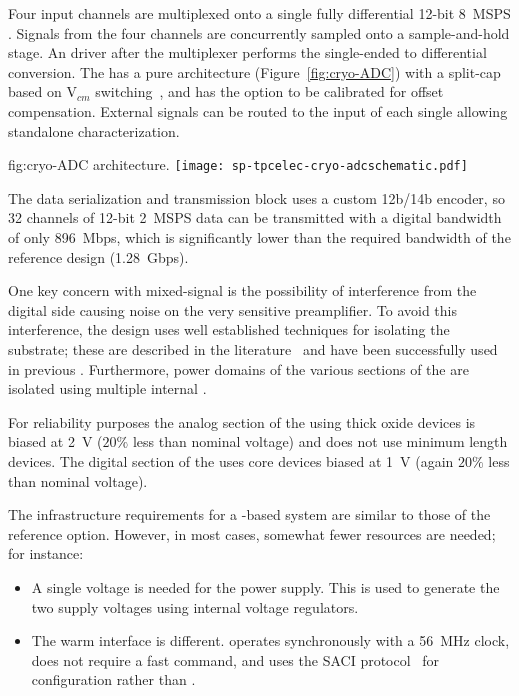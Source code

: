 Four input channels are multiplexed onto a single fully differential 12-bit \SI{8}{MSPS} 
. Signals from the four channels are concurrently sampled onto a sample-and-hold 
stage. An  driver after the multiplexer performs the single-ended to differential 
conversion. The  has a pure  architecture (Figure~\ref{fig:cryo-ADC}) 
with a split-cap  based on V$_{cm}$ switching~\cite{5482529}, and has the option to be 
calibrated for offset compensation. External signals can be routed to the input of each single 
 allowing standalone characterization.

\begin{dunefigure}
{fig:cryo-ADC}
{  architecture.}
\texttt{[image: sp-tpcelec-cryo-adcschematic.pdf]}
\end{dunefigure}


The data serialization and transmission block uses a custom 12b/14b encoder, so 32 channels 
of 12-bit \SI{2}{MSPS} data can be transmitted with a digital bandwidth of only \SI{896}{Mbps}, 
which is significantly lower than the required bandwidth of the reference design (\SI{1.28}{Gbps}).

One key concern with mixed-signal  is the possibility of interference from the 
digital side causing noise on the very sensitive preamplifier. To avoid this interference, 
the  design uses well established techniques for isolating the substrate;
these are described in the literature~\cite{yeh} and have been successfully used in previous 
. Furthermore, power domains of the various sections of the  are 
isolated using multiple internal .

For reliability purposes the analog section of the  using thick oxide devices 
is biased at \SI{2}{V} ($\num{20}\%$ less than nominal voltage) and does not use minimum length devices.
The digital section of the  uses core devices biased at \SI{1}{V} (again $\num{20}\%$ 
less than nominal voltage).

The infrastructure requirements for a  -based system are similar 
to those of the reference option. However, in most cases, somewhat fewer resources are 
needed; for instance:
\begin{itemize}
\item A single voltage is needed for the power supply. This is used to generate the two 
supply voltages using internal voltage regulators.
\item The warm interface is different.  operates synchronously
with a \SI{56}{MHz} clock, does not require a fast command, and uses the 
SACI protocol~\cite{SACI} for configuration rather than .
\end{itemize}

